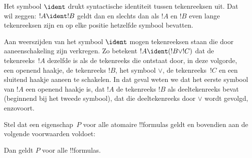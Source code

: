 \documentclass[openany]{memoir}
\begin{document}
\begin{defn}
Het symbool $\ident$ drukt syntactische identiteit tussen tekenreeksen
uit. Dat wil zeggen: $!A \ident !B$ geldt dan en slechts dan als $!A$ en
$!B$ even lange tekenreeksen zijn en op elke positie hetzelfde symbool
bevatten.
\end{defn}

Aan weerszijden van het symbool $\ident$ mogen tekenreeksen staan die
door aaneenschakeling zijn verkregen. Zo betekent $!A \ident (!B \lor
!C)$ dat de tekenreeks~$!A$ dezelfde is als de tekenreeks die ontstaat
door, in deze volgorde, een openend haakje, de tekenreeks $!B$, het
symbool $\lor$, de tekenreeks~$!C$ en een sluitend haakje aaneen te
schakelen. In dat geval weten we dat het eerste symbool van $!A$ een
openend haakje is, dat $!A$ de tekenreeks $!B$ als deeltekenreeks bevat
(beginnend bij het tweede symbool), dat die deeltekenreeks door $\lor$
wordt gevolgd, enzovoort.
\endgroup

\begingroup
\def\olfilename{OLP-0059}
\def\olfilepath{content/propositional-logic/syntax-and-semantics/}
\hypertarget{unit-OLP-0059}{}





\begin{thm}
  Stel dat een eigenschap~$P$ voor alle atomaire !!{formula}s geldt en
  bovendien aan de volgende voorwaarden voldoet:
  \begin{enumerate}
  \end{enumerate}
  Dan geldt $P$ voor alle !!{formula}s.
\end{thm}
\end{document}
